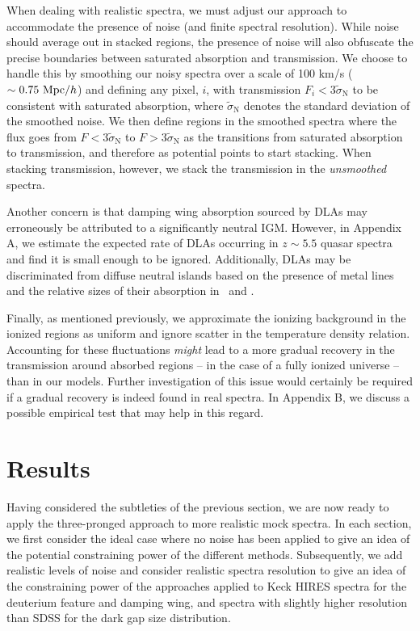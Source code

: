 When dealing with realistic spectra, we must adjust our approach to accommodate the presence of noise (and finite spectral resolution). While noise should average out in stacked regions, the presence of noise will also obfuscate the precise boundaries between saturated absorption and transmission. We choose to handle this by smoothing our noisy spectra over a scale of 100 km/s ($\sim 0.75\ \text{Mpc/$h$}$) and defining any pixel, $i$, with transmission $F_i < 3\tilde{\sigma}_{\text{N}}$ to be consistent with saturated absorption, where $\tilde{\sigma}_{\text{N}}$ denotes the standard deviation of the smoothed noise. We then define regions in the smoothed spectra where the flux goes from $F<3\tilde{\sigma}_{\text{N}}$ to $F>3\tilde{\sigma}_{\text{N}}$ as the transitions from saturated absorption to transmission, and therefore as potential points to start stacking. When stacking transmission, however, we stack the transmission in the \textit{unsmoothed} spectra.

Another concern is that damping wing absorption sourced by DLAs may erroneously be attributed to a significantly neutral IGM. However, in Appendix A, we estimate the expected rate of DLAs occurring in $z \sim 5.5$ quasar spectra and find it is small enough to be ignored. Additionally, DLAs may be discriminated from diffuse neutral islands based on the presence of metal lines and the relative sizes of their absorption in \lya\ and \lyb. 

Finally, as mentioned previously, we approximate the ionizing background in the ionized regions as uniform and ignore scatter in the temperature density relation. Accounting for these fluctuations {\em might}
lead to a more gradual recovery in the transmission around absorbed regions -- in the case of a fully ionized universe -- than in our models. Further investigation of this issue would certainly be required if a gradual recovery
is indeed found in real spectra. In Appendix B, we discuss a possible empirical test that may help in this regard.



\section{Results} \label{sec:Results}


Having considered the subtleties of the previous section, we are now ready to apply the three-pronged approach to more realistic mock spectra. In each section, we first consider the ideal case where no noise has been applied to give an idea of the potential constraining power of the different methods. Subsequently, we add realistic levels of noise and consider realistic spectra resolution to give an idea of the constraining power of the approaches applied to Keck HIRES spectra for the deuterium feature and damping wing, and spectra with slightly higher resolution than SDSS for the dark gap size distribution.


